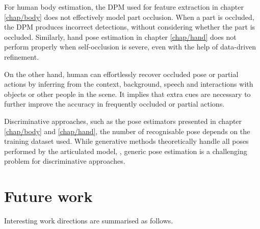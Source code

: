 For human body estimation, the DPM used for feature extraction in chapter \ref{chap/body} does not effectively model part occlusion. When a part is occluded, the DPM produces incorrect detections, without considering whether the part is occluded. Similarly, hand pose estimation in chapter \ref{chap/hand} does not perform properly when self-occlusion is severe, even with the help of data-driven refinement. 

On the other hand, human can effortlessly recover occluded pose or partial actions by inferring from the context, \eg background, speech and interactions with objects or other people in the scene. It implies that extra cues are necessary to further improve the accuracy in frequently occluded or partial actions. 

Discriminative approaches, such as the pose estimators presented in chapter \ref{chap/body} and \ref{chap/hand}, the number of recognisable pose depends on the training dataset used. While generative methods theoretically handle all poses performed by the articulated model, \eg \cite{Oikonomidis2011}, generic pose estimation is a challenging problem for discriminative approaches. 

\section{Future work}

Interesting work directions are summarised as follows.

